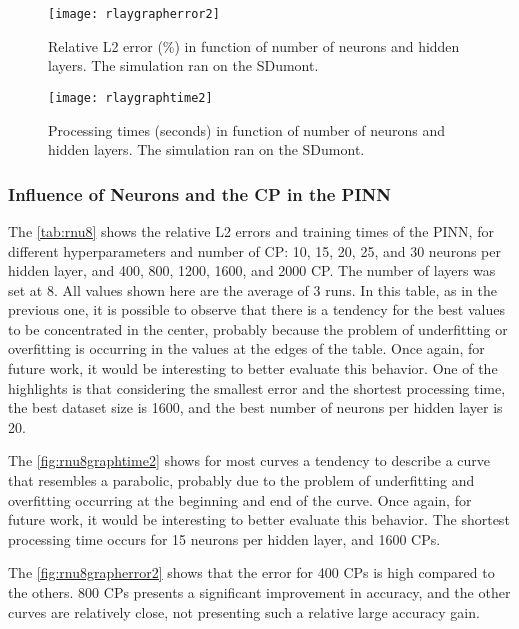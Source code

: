 \begin{figure}[htb]\centering
\texttt{[image: rlaygrapherror2]}
\vspace{0em}
\caption{Relative L2 error (\%) in function of number of neurons and hidden layers. The simulation ran on the SDumont.}
\label{fig:rlaygrapherror2}
\end{figure}

\begin{figure}[htb]\centering
\texttt{[image: rlaygraphtime2]}
\vspace{0em}
\caption{Processing times (seconds) in function of number of neurons and hidden layers. The simulation ran on the SDumont.}
\label{fig:rlaygraptime2}
\end{figure}

\subsubsection{Influence of Neurons and the CP in the PINN}

The \autoref{tab:rnu8} shows the relative L2 errors and training times of the PINN, for different hyperparameters and number of CP: 10, 15, 20, 25, and 30 neurons per hidden layer, and 400, 800, 1200, 1600, and 2000 CP. The number of layers was set at 8. All values shown here are the average of 3 runs. In this table, as in the previous one, it is possible to observe that there is a tendency for the best values to be concentrated in the center, probably because the problem of underfitting or overfitting is occurring in the values at the edges of the table. Once again, for future work, it would be interesting to better evaluate this behavior. One of the highlights is that considering the smallest error and the shortest processing time, the best dataset size is 1600, and the best number of neurons per hidden layer is 20.

The \autoref{fig:rnu8graphtime2} shows for most curves a tendency to describe a curve that resembles a parabolic, probably due to the problem of underfitting and overfitting occurring at the beginning and end of the curve. Once again, for future work, it would be interesting to better evaluate this behavior. The shortest processing time occurs for 15 neurons per hidden layer, and 1600 CPs.

The \autoref{fig:rnu8grapherror2} shows that the error for 400 CPs is high compared to the others. 800 CPs presents a significant improvement in accuracy, and the other curves are relatively close, not presenting such a relative large accuracy gain.

